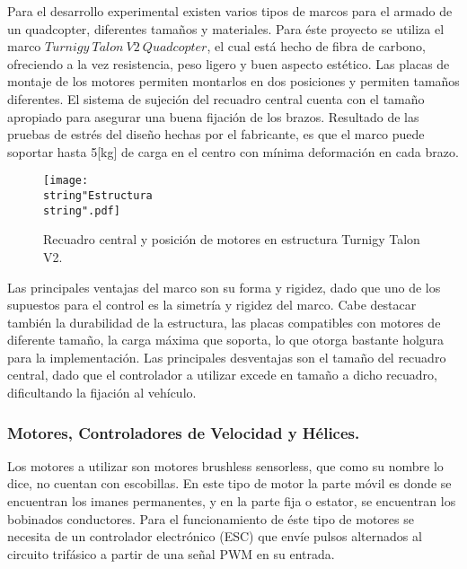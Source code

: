 \documentclass[\main/main.tex]{subfiles}
\begin{document}
Para el desarrollo experimental existen varios tipos de marcos para
el armado de un quadcopter, diferentes tamaños y materiales. Para
éste proyecto se utiliza el marco $Turnigy\ Talon\ V2\ Quadcopter$,
el cual está hecho de fibra de carbono, ofreciendo a la vez resistencia,
peso ligero y buen aspecto estético. Las placas de montaje de los
motores permiten montarlos en dos posiciones y permiten tamaños diferentes.
El sistema de sujeción del recuadro central cuenta con el tamaño apropiado
para asegurar una buena fijación de los brazos. Resultado de las pruebas
de estrés del diseño hechas por el fabricante, es que el marco puede soportar hasta 5{[}kg{]}
de carga en el centro con mínima deformación en cada brazo. 

\begin{figure}[H]
\noindent \begin{centering}
\texttt{[image: \\string"Estructura\\string".pdf]}
\par\end{centering}
\caption{Recuadro central y posición de motores en estructura Turnigy Talon
V2.}
\end{figure}

Las principales ventajas del marco son su forma y rigidez, dado que
uno de los supuestos para el control es la simetría y rigidez del
marco. Cabe destacar también la durabilidad de la estructura, las
placas compatibles con motores de diferente tamaño, la carga máxima
que soporta, lo que otorga bastante holgura para la implementación.
Las principales desventajas son el tamaño del recuadro central, dado
que el controlador a utilizar excede en tamaño a dicho recuadro, dificultando
la fijación al vehículo.

\subsubsection{Motores, Controladores de Velocidad y Hélices.}

Los motores a utilizar son motores brushless sensorless, que como
su nombre lo dice, no cuentan con escobillas. En este tipo de motor
la parte móvil es donde se encuentran los imanes permanentes, y en
la parte fija o estator, se encuentran los bobinados conductores.
Para el funcionamiento de éste tipo de motores se necesita de un controlador
electrónico (ESC) que envíe pulsos alternados al circuito trifásico
a partir de una señal PWM en su entrada. 

\textcompwordmark{}
\end{document}

